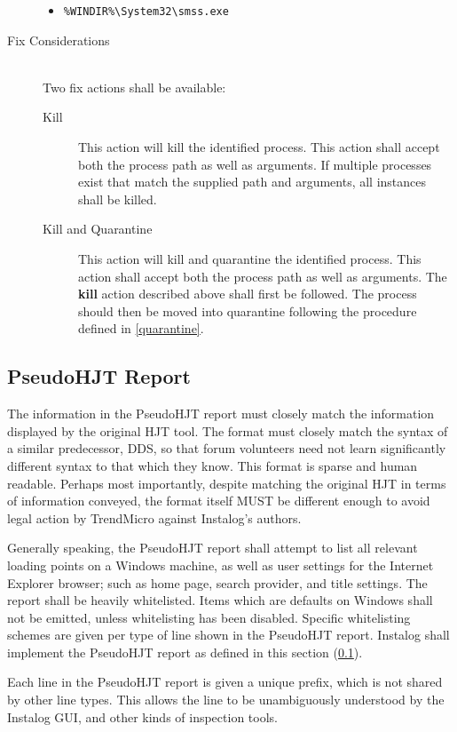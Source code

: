 \begin{description}
\begin{itemize}
  \item \verb|%WINDIR%\System32\smss.exe|
\end{itemize}
\item[Fix Considerations] \hfill \\
Two fix actions shall be available:
\begin{description}
\item[Kill] This action will kill the identified process.  This action shall
accept both the process path as well as arguments.  If multiple processes exist
that match the supplied path and arguments, all instances shall be killed. 
\item[Kill and Quarantine]  This action will kill and quarantine the identified
process.  This action shall accept both the process path as well as arguments. 
The \textbf{kill} action described above shall first be followed.  The process
should then be moved into quarantine following the procedure defined in
\ref{quarantine}.  
\end{description}
\end{description}

\subsection{PseudoHJT Report} \label{hjtgeneral}
The information in the PseudoHJT report must closely match the information
displayed by the original HJT tool. The format must closely match the syntax of
a similar predecessor, DDS, so that forum volunteers need not learn
significantly different syntax to that which they know. This format is
sparse and human readable. Perhaps most importantly, despite matching the
original HJT in terms of information conveyed, the format itself MUST be
different enough to avoid legal action by TrendMicro against Instalog's authors.

Generally speaking, the PseudoHJT report shall attempt to list all relevant
loading points on a Windows machine, as well as user settings for the Internet
Explorer browser; such as home page, search provider, and title settings. The
report shall be heavily whitelisted. Items which are defaults on Windows shall
not be emitted, unless whitelisting has been disabled. Specific whitelisting
schemes are given per type of line shown in the PseudoHJT report. Instalog shall
implement the PseudoHJT report as defined in this section (\ref{hjtgeneral}).

Each line in the PseudoHJT report is given a unique prefix, which is not shared
by other line types. This allows the line to be unambiguously understood by the
Instalog GUI, and other kinds of inspection tools.

